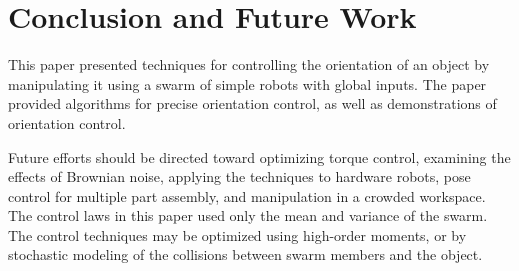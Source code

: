 \section{Conclusion and Future Work}\label{sec:conclusion}


This paper presented techniques for controlling the orientation of an object by manipulating it using a swarm of simple robots with global inputs.
The paper provided algorithms for precise orientation control, as well as demonstrations of orientation control. 


Future efforts should be directed toward optimizing torque control, examining the effects of Brownian noise, applying the techniques to hardware robots, pose control for multiple part assembly, and manipulation in a crowded workspace.
The control laws in this paper used only the mean and variance of the swarm.  The control techniques may be optimized using high-order moments, or by stochastic modeling of the collisions between swarm members and the object.



%    
%    
    
